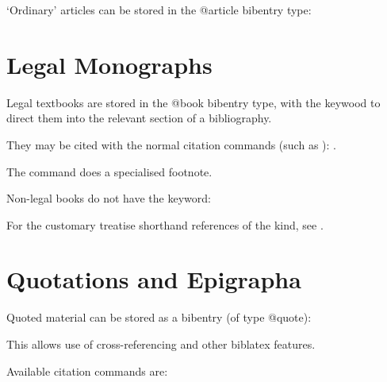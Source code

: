 \p `Ordinary' articles can be stored in the @article bibentry type: \begin{myquotation}\noindent{}\end{myquotation}

\section{Legal Monographs}

\p Legal textbooks are stored in the @book bibentry type, with the keywood  to direct them into the relevant section of a bibliography.

\p They may be cited with the normal citation commands (such as ): \cite{lrcns}.

\p The  command does a specialised footnote.

\p Non-legal books do not have the keyword: \cite{litlaw}

\p For the customary treatise shorthand references of the  kind, see .%


\section{Quotations and Epigrapha}
\label{sec:epigrapha}

\bigskip
\p Quoted material can be stored as a bibentry (of type @quote):

This allows use of cross-referencing and other biblatex features.

\p Available citation commands are:

